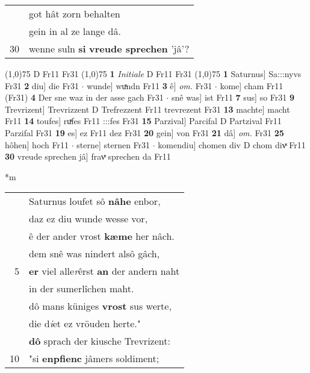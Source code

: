 \documentclass[8pt,a4paper,notitlepage]{article}
\begin{document}
\begin{table}[ht]
\begin{minipage}[t]{0.5\linewidth}
\begin{tabular}{rl}
 & got hât zorn behalten\\ 
 & gein in al ze lange dâ.\\ 
30 & wenne suln \textbf{si} \textbf{vreude sprechen} 'jâ'?\\ 
\end{tabular}
\scriptsize
\line(1,0){75} \newline
D Fr11 Fr31 \newline
\line(1,0){75} \newline
\textbf{1} \textit{Initiale} D Fr11 Fr31  \newline
\line(1,0){75} \newline
\textbf{1} Saturnus] Sa:::nyvs Fr31 \textbf{2} diu] die Fr31  $\cdot$ wunde] wuͯndn Fr11 \textbf{3} ê] \textit{om.} Fr31  $\cdot$ kome] cham Fr11 (Fr31) \textbf{4} Der sne waz in der asse gach Fr31  $\cdot$ snê was] ist Fr11 \textbf{7} sus] so Fr31 \textbf{9} Trevrizent] Trevrizzent D Trefrezzent Fr11 trevrezent Fr31 \textbf{13} machte] macht Fr11 \textbf{14} toufes] ruͯfes Fr11 :::fes Fr31 \textbf{15} Parzival] Parcifal D Partzival Fr11 Parzifal Fr31 \textbf{19} es] ez Fr11 dez Fr31 \textbf{20} gein] von Fr31 \textbf{21} dâ] \textit{om.} Fr31 \textbf{25} hôhen] hoch Fr11  $\cdot$ sterne] sternen Fr31  $\cdot$ komendiu] chomen div D chom divͯ Fr11 \textbf{30} vreude sprechen jâ] fravͯ sprechen da Fr11 \newline
\end{minipage}
\hspace{0.5cm}
\begin{minipage}[t]{0.5\linewidth}
\small
\begin{center}*m
\end{center}
\begin{tabular}{rl}
 & Saturnus loufet sô \textbf{nâhe} enbor,\\ 
 & daz ez diu wunde wesse vor,\\ 
 & ê der ander vrost \textbf{kæme} her nâch.\\ 
 & dem snê was nindert alsô gâch,\\ 
5 & \textbf{er} viel alle\textit{r}êrst \textbf{an} der andern naht\\ 
 & in der sumerlîchen maht.\\ 
 & dô mans küniges \textbf{vrost} sus werte,\\ 
 & die d\textit{i}et ez vröuden herte."\\ 
 & \textbf{dô} sprach der kiusche Trevrizent:\\ 
10 & "si \textbf{enpfienc} jâmers soldiment;\\ 

\end{tabular}
\end{minipage}
\end{table}
\end{document}
